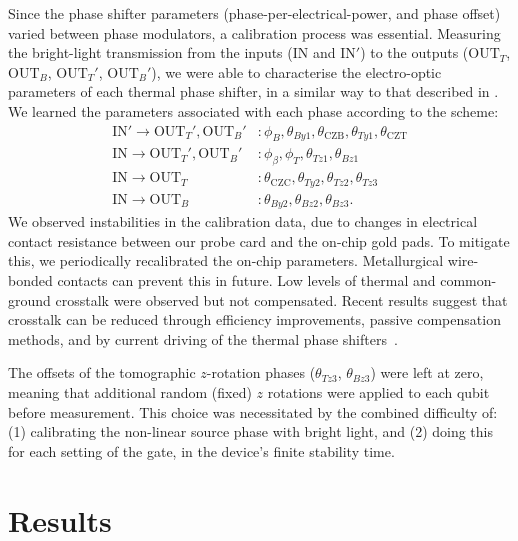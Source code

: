 \documentclass[
twocolumn,
 amsmath,amssymb,
 aps,
  twoside,
 superscriptaddress,
pra,
longbibliography
]{revtex4-1}
\begin{document}
Since the phase shifter parameters (phase-per-electrical-power, and phase offset) varied between phase modulators, a calibration process was essential. Measuring the bright-light transmission from the inputs ($\mathrm{IN}$ and $\mathrm{IN}'$) to the outputs ($\mathrm{OUT}_T$, $\mathrm{OUT}_B$, $\mathrm{OUT}_T'$, $\mathrm{OUT}_B'$),
we were able to characterise the electro-optic parameters of each thermal phase shifter, in a similar way to that described in \cite{Santagati2016}. We learned the parameters associated with each phase according to the scheme:
\begin{equation}
\begin{split}
\mathrm{IN}' \rightarrow \mathrm{OUT}_T', \mathrm{OUT}_B' &: \phi_{B}, \theta_{By1}, 
\theta_{\mathrm{CZB}}, \theta_{Ty1}, \theta_{\mathrm{CZT}}\\
\mathrm{IN} \rightarrow \mathrm{OUT}_T', \mathrm{OUT}_B' &: \phi_\beta, \phi_{T}, \theta_{Tz1}, \theta_{Bz1}\\
\mathrm{IN} \rightarrow \mathrm{OUT}_T &: \theta_{\mathrm{CZC}}, \theta_{Ty2}, \theta_{Tz2}, \theta_{Tz3}\\
\mathrm{IN} \rightarrow \mathrm{OUT}_B &: \theta_{By2}, \theta_{Bz2}, \theta_{Bz3}.
\end{split}
\label{eq:calibration}
\end{equation}
We observed instabilities in the calibration data, due to changes in electrical contact resistance between our probe card and the on-chip gold pads. To mitigate this, we periodically recalibrated the on-chip parameters. Metallurgical wire-bonded contacts can prevent this in future. Low levels of thermal and common-ground crosstalk were observed but not compensated. Recent results suggest that crosstalk can be reduced through efficiency improvements, passive compensation methods, and by current driving of the thermal phase shifters~\cite{Harris:2014kz, Santagati2016, Paesani:2017ga}.

The offsets of the tomographic $z$-rotation phases ($\theta_{Tz3}$, $\theta_{Bz3}$) were left at zero, meaning that additional random (fixed) $z$ rotations were applied to each qubit before measurement. This choice was necessitated by the combined difficulty of: (1) calibrating the non-linear source phase with bright light, and (2) doing this for each setting of the gate, in the device's finite stability time.

\section{Results}
\end{document}
